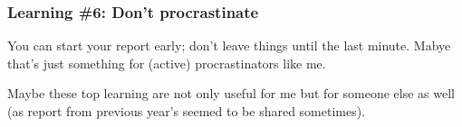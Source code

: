 \documentclass[journal, a4paper]{IEEEtran}
\begin{document}
\hfill
\subsubsection{Learning \#6: Don't procrastinate}
You can start your report early; don't leave things until the last minute. Mabye that's just something for (active) procrastinators like me.

\hfill
Maybe these top learning are not only useful for me but for someone else as well (as report from previous year's seemed to be shared sometimes).

\end{document}
